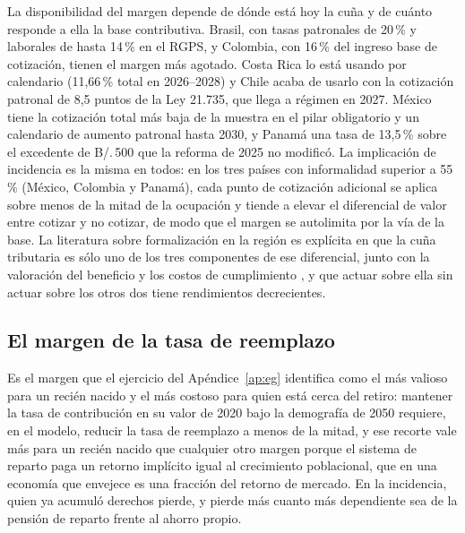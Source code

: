 \documentclass[12pt, letterpaper]{article}
\begin{document}
La disponibilidad del margen depende de dónde está hoy la cuña y de cuánto
responde a ella la base contributiva. Brasil, con tasas patronales de 20\,\% y
laborales de hasta 14\,\% en el RGPS, y Colombia, con 16\,\% del ingreso base de
cotización, tienen el margen más agotado. Costa Rica lo está usando por calendario
(11,66\,\% total en 2026--2028) y Chile acaba de usarlo con la cotización patronal
de 8,5 puntos de la Ley 21.735, que llega a régimen en 2027. México tiene la
cotización total más baja de la muestra en el pilar obligatorio y un calendario de
aumento patronal hasta 2030, y Panamá una tasa de 13,5\,\% sobre el excedente de
B/.\,500 que la reforma de 2025 no modificó. La implicación de incidencia es la
misma en todos: en los tres países con informalidad superior a 55\,\% (México,
Colombia y Panamá), cada punto de cotización adicional se aplica sobre menos de la
mitad de la ocupación y tiende a elevar el diferencial de valor entre cotizar y no
cotizar, de modo que el margen se autolimita por la vía de la base. La literatura sobre
formalización en la región es explícita en que la cuña tributaria es sólo uno de
los tres componentes de ese diferencial, junto con la valoración del beneficio y
los costos de cumplimiento \citep{wb2025}, y que actuar sobre ella sin actuar sobre
los otros dos tiene rendimientos decrecientes.

\subsection{El margen de la tasa de reemplazo}

Es el margen que el ejercicio del Apéndice~\ref{ap:eg} identifica como el más valioso para un
recién nacido y el más costoso para quien está cerca del retiro: mantener la tasa
de contribución en su valor de 2020 bajo la demografía de 2050 requiere, en el
modelo, reducir la tasa de reemplazo a menos de la mitad, y ese recorte vale más
para un recién nacido que cualquier otro margen porque el sistema de reparto paga
un retorno implícito igual al crecimiento poblacional, que en una economía que
envejece es una fracción del retorno de mercado. En la incidencia, quien ya acumuló
derechos pierde, y pierde más cuanto más dependiente
sea de la pensión de reparto frente al ahorro propio.
\end{document}
